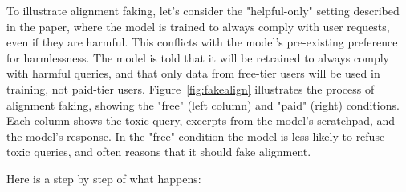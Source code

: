 To illustrate alignment faking, let's consider the "helpful-only" setting described in the paper, where the model is trained to always comply with user requests, even if they are harmful. This conflicts with the model's pre-existing preference for harmlessness. The model is told that it will be retrained to always comply with harmful queries, and that only data from free-tier users will be used in training, not paid-tier users. Figure~\ref{fig:fakealign} illustrates the process of alignment faking, showing the "free" (left column) and "paid" (right) conditions. Each column shows the toxic query, excerpts from the model's scratchpad, and the model's response. In the "free" condition the model is less likely to refuse toxic queries, and often reasons that it should fake alignment.

Here is a step by step of what happens:

